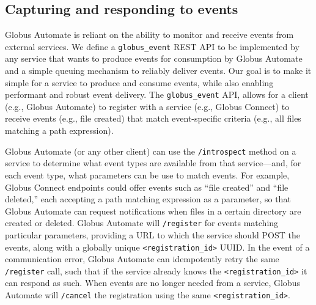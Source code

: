 \documentclass{aip-cp}
\newcommand\code[1]{{\tt \footnotesize #1}}
\newcommand\bluecode[1]{\code{#1}}
\newcommand\darkcode[1]{\code{#1}}
\begin{document}
\subsection{Capturing and responding to events}
Globus Automate is reliant on the ability to monitor and receive events from
external services. 
We define a \darkcode{globus\_event} REST API to be implemented by any service that wants to produce 
events for consumption by Globus Automate
and a simple queuing mechanism to reliably deliver events.
Our goal is to make it simple for a service to produce and consume events, 
while also enabling performant and robust event delivery.
The \darkcode{globus\_event}  API, 
allows for a client (e.g., Globus Automate) to register with a service (e.g., Globus Connect) 
to receive events (e.g., file created) that match event-specific criteria (e.g., all files matching 
a path expression). 


Globus Automate (or any other client)
can use the \darkcode{/introspect} method on a service 
to determine what event types are available from that service---and,
for each event type, what parameters can be use to match events. 
For example, Globus Connect endpoints could offer
events such as ``file created'' and ``file deleted,'' 
each accepting a path matching expression as a parameter,
so that Globus Automate can request notifications when 
files in a certain directory are created or deleted.
Globus Automate will \darkcode{/register} 
for events matching particular parameters, providing a URL to which the service should POST the 
events, along with a globally unique \bluecode{<registration\_id>} UUID.  In the event of a 
communication error, Globus Automate can idempotently retry the same \darkcode{/register} call, such 
that if the service already knows the \bluecode{<registration\_id>} it can respond as such.
When events are no longer needed from a service, Globus Automate will \darkcode{/cancel} the 
registration 
using the same \bluecode{<registration\_id>}.
\end{document}
